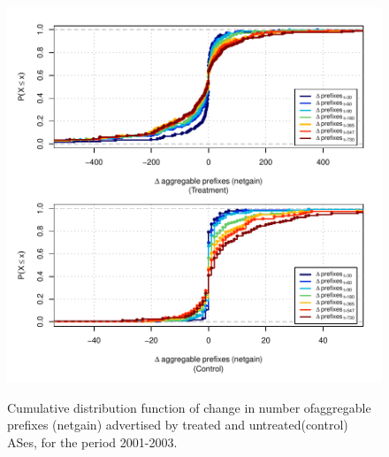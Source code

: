 \clearpage
\vspace*{16pt}
\begin{figure}[H]
\begin{centering}
\begin{singlespace}
\captionsetup{list=no}
    \includegraphics[width=6in]{figures/behavior-netgain-2001_2003-corr.pdf}
    \vspace{-2em}\\
    \caption{Cumulative distribution function of change in number ofaggregable
    prefixes (netgain) advertised by treated and untreated(control) ASes, for
    the period 2001-2003.}
\end{singlespace}
\end{centering}
\end{figure}

